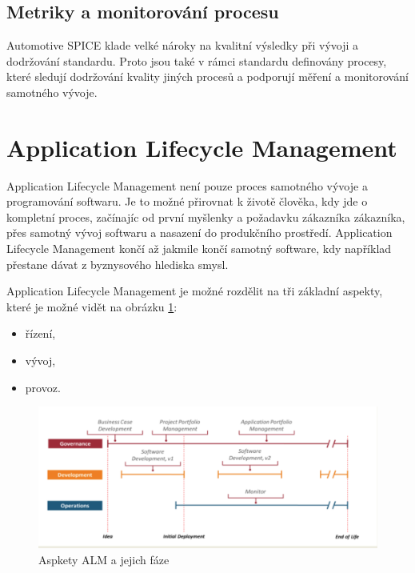 \documentclass[czech,master,public,dept460,male,cpdeclaration,oneside]{diploma}
\begin{document}
\subsection{Metriky a monitorování procesu}
Automotive SPICE klade velké nároky na kvalitní výsledky při vývoji a dodržování standardu. Proto jsou také v rámci standardu definovány procesy, které sledují dodržování kvality jiných procesů a podporují měření a monitorování samotného vývoje.



\section{Application Lifecycle Management}

Application Lifecycle Management není pouze proces samotného vývoje a programování softwaru. Je to možné přirovnat k životě člověka, kdy jde o kompletní proces, začínajíc od první myšlenky a požadavku zákazníka zákazníka, přes samotný vývoj softwaru a nasazení do produkčního prostředí. Application Lifecycle Management končí až jakmile končí samotný software, kdy například přestane dávat z byznysového hlediska smysl. \cite{alm_chappell}

Application Lifecycle Management je možné rozdělit na tři základní aspekty, které je možné vidět na obrázku \ref{fig:alm}:

\begin{itemize}
  \item řízení,
  \item vývoj,
  \item provoz.
\end{itemize}

\begin{figure}[!ht]
    \centering
    \includegraphics[width=1\textwidth]{Diplomka/Figures/alm.png}
    \caption{Aspkety ALM a jejich fáze \cite{alm_chappell}}
    \label{fig:alm}
\end{figure}
\end{document}
